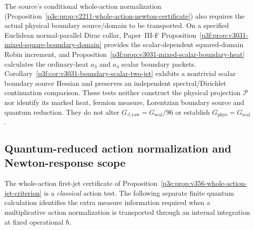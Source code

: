 \documentclass[12pt,a4paper]{article}
\begin{document}
\begin{remark}
\label{p3e:rem:v3031-newton-boundary-transport}
The source's conditional whole-action normalization
(Proposition~\ref{p3e:prop:v2211-whole-action-newton-certificate})
also requires the actual physical boundary source/domain to be transported.
On a specified Euclidean normal-parallel Dirac collar,
Paper~III-F Proposition~\ref{p3f:prop:v3031-mixed-square-boundary-domain}
provides the scalar-dependent squared-domain Robin increment,
and Proposition~\ref{p3f:prop:v3031-mixed-scalar-boundary-heat}
calculates the ordinary-heat $a_3$ and $a_4$ scalar boundary packets.
Corollary~\ref{p3f:cor:v3031-boundary-scalar-two-jet}
exhibits a nontrivial scalar boundary source Hessian and preserves
an independent spectral/Dirichlet continuation comparison.
These tests neither construct the physical projection $\mathcal P$
nor identify its marked heat, fermion measure, Lorentzian boundary
source and quantum reduction.  They do not alter
$G_{J,\mathrm{raw}}=G_{\mathrm{scal}}/96$ or establish
$G_{\mathrm{phys}}=G_{\mathrm{scal}}$.
\end{remark}


\subsection{Quantum-reduced action normalization and Newton-response scope}
\label{p3e:sec:v358-quantum-newton}
The whole-action first-jet certificate of
Proposition~\ref{p3e:prop:v356-whole-action-jet-criterion} is a
\emph{classical} action test.  The following separate finite quantum
calculation identifies the extra measure information required when a
multiplicative action normalization is transported through an internal
integration at fixed operational $\hbar$.
\end{document}
